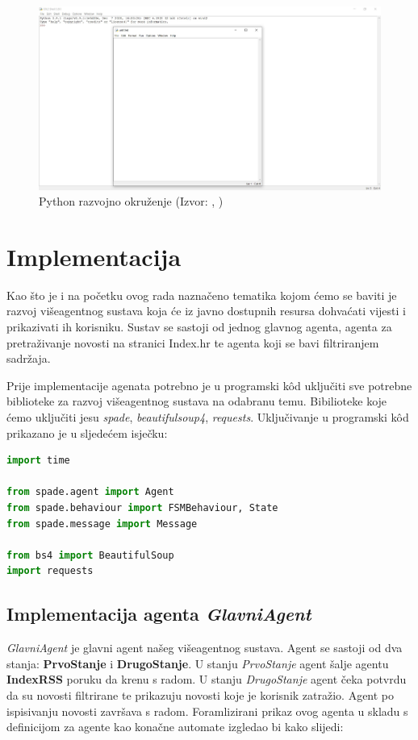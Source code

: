 \documentclass[]{foi} %
\begin{document}
\begin{figure}[h!]
    \centering
    \includegraphics[width=1.0\textwidth]{slike/pythonIDLE.jpg}
    \caption{Python razvojno okruženje (Izvor: \citeauthor{idle}, \citeyear{idle})}
    \label{fig:PythonIDLE}
\end{figure}

\newpage

\chapter{Implementacija}

Kao što je i na početku ovog rada naznačeno tematika kojom ćemo se baviti je razvoj višeagentnog sustava koja će iz javno dostupnih resursa dohvaćati vijesti i prikazivati ih korisniku. Sustav se sastoji od jednog glavnog agenta, agenta za pretraživanje novosti na stranici Index.hr te agenta koji se bavi filtriranjem sadržaja.

Prije implementacije agenata potrebno je u programski kôd uključiti sve potrebne biblioteke za razvoj višeagentnog sustava na odabranu temu. Bibilioteke koje ćemo uključiti jesu \textit{spade}, \textit{beautifulsoup4}, \textit{requests}. Uključivanje u programski kôd prikazano je u sljedećem isječku:

\begin{lstlisting}[language=Python, caption={Potrebne biblioteke}]
import time

from spade.agent import Agent
from spade.behaviour import FSMBehaviour, State
from spade.message import Message

from bs4 import BeautifulSoup
import requests
\end{lstlisting}

\section{Implementacija agenta \textit{GlavniAgent}}
\textit{GlavniAgent} je glavni agent našeg višeagentnog sustava. Agent se sastoji od dva stanja: \textbf{PrvoStanje} i \textbf{DrugoStanje}. U stanju \textit{PrvoStanje} agent šalje agentu \textbf{IndexRSS} poruku da krenu s radom. U stanju \textit{DrugoStanje} agent čeka potvrdu da su novosti filtrirane te prikazuju novosti koje je korisnik zatražio. Agent po ispisivanju novosti završava s radom. Foramlizirani prikaz ovog agenta u skladu s definicijom za agente kao konačne automate izgledao bi kako slijedi:
\end{document}
